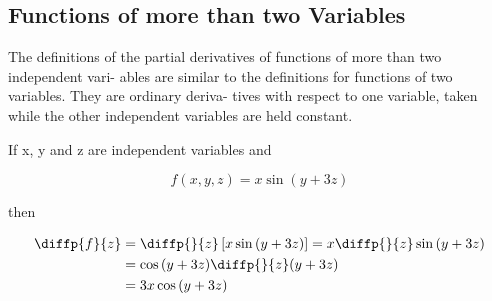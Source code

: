 \documentclass[12pt,a4paper,draft]{article}
\begin{document}
\subsection{Functions of more than two Variables}

The definitions of the partial derivatives of functions of more than two independent vari-
ables are similar to the definitions for functions of two variables. They are ordinary deriva-
tives with respect to one variable, taken while the other independent variables are held
constant.


\begin{example}
    If x, y and z are independent variables and

    \[f(x,y,z) = x \sin{(y + 3z)}\]
    
    then

    \begin{align*}
        \diffp{f}{z} &= \diffp{}{z}\left[x \sin{(y + 3z)}\right] = x \diffp{}{z}\sin{(y + 3z)}\\
        &= \cos{(y + 3z)} \diffp{}{z} (y + 3z)\\
        &= 3x\cos{(y + 3z)} 
    \end{align*}
    

\end{example}

\newpage
\end{document}
